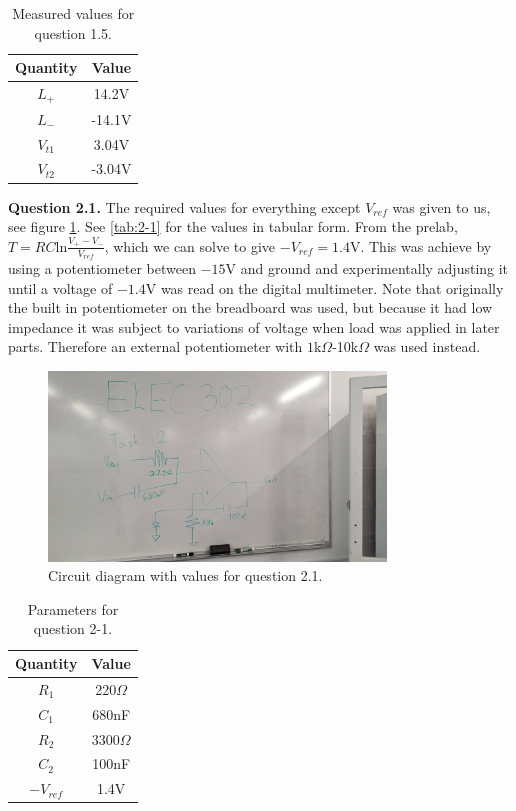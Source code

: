 \documentclass[letterpaper, reqno,11pt]{article}
\begin{document}
\begin{table}[htpb]
    \centering
    \caption{Measured values for question 1.5.}
    \label{tab:1-5}
    \begin{tabular}{|c|c|}
        \hline
        Quantity & Value\\
        \hline 
        $L_{+}$&14.2V\\
        $L_-$&-14.1V\\
        $V_{t1}$&3.04V\\
        $V_{t2}$&-3.04V\\
        \hline
    \end{tabular}
\end{table}

{\medskip\noindent\bf Question 2.1.} The required values for everything except $V_{ref}$ was given to us, see figure \ref{fig:2-1}. See \ref{tab:2-1} for the values in tabular form. From the prelab, $T=RC\text{ln} \frac{V_+-V_-}{V_{ref}}$, which we can solve to give $-V_{ref}=1.4$V. This was achieve by using a potentiometer between $-15$V and ground and experimentally adjusting it until a voltage of $-1.4$V was read on the digital multimeter. Note that originally the built in potentiometer on the breadboard was used, but because it had low impedance it was subject to variations of voltage when load was applied in later parts. Therefore an external potentiometer with $1$k$\Omega$-10k$\Omega$ was used instead.

\begin{figure}[htpb]
    \centering
    \includegraphics[width=0.8\textwidth]{2-1}
    \caption{Circuit diagram with values for question 2.1.}
    \label{fig:2-1}
\end{figure}

\begin{table}[htpb]
    \centering
    \caption{Parameters for question 2-1.}
    \label{tab:1-5}
    \begin{tabular}{|c|c|}
        \hline
        Quantity & Value\\
        \hline 
        $R_1$&220$\Omega$\\
        $C_1$&680nF\\
        $R_2$&$3300\Omega$\\
        $C_2$&100nF\\
        $-V_{ref}$&1.4V\\
        \hline
    \end{tabular}
\end{table}
\end{document}

